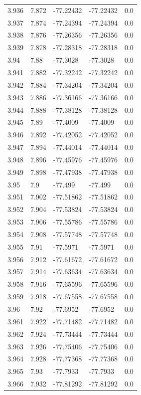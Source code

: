 \begin{tabular}{lllll}
3.936 & 7.872 & -77.22432 & -77.22432 & 0.0 \\
3.937 & 7.874 & -77.24394 & -77.24394 & 0.0 \\
3.938 & 7.876 & -77.26356 & -77.26356 & 0.0 \\
3.939 & 7.878 & -77.28318 & -77.28318 & 0.0 \\
3.94 & 7.88 & -77.3028 & -77.3028 & 0.0 \\
3.941 & 7.882 & -77.32242 & -77.32242 & 0.0 \\
3.942 & 7.884 & -77.34204 & -77.34204 & 0.0 \\
3.943 & 7.886 & -77.36166 & -77.36166 & 0.0 \\
3.944 & 7.888 & -77.38128 & -77.38128 & 0.0 \\
3.945 & 7.89 & -77.4009 & -77.4009 & 0.0 \\
3.946 & 7.892 & -77.42052 & -77.42052 & 0.0 \\
3.947 & 7.894 & -77.44014 & -77.44014 & 0.0 \\
3.948 & 7.896 & -77.45976 & -77.45976 & 0.0 \\
3.949 & 7.898 & -77.47938 & -77.47938 & 0.0 \\
3.95 & 7.9 & -77.499 & -77.499 & 0.0 \\
3.951 & 7.902 & -77.51862 & -77.51862 & 0.0 \\
3.952 & 7.904 & -77.53824 & -77.53824 & 0.0 \\
3.953 & 7.906 & -77.55786 & -77.55786 & 0.0 \\
3.954 & 7.908 & -77.57748 & -77.57748 & 0.0 \\
3.955 & 7.91 & -77.5971 & -77.5971 & 0.0 \\
3.956 & 7.912 & -77.61672 & -77.61672 & 0.0 \\
3.957 & 7.914 & -77.63634 & -77.63634 & 0.0 \\
3.958 & 7.916 & -77.65596 & -77.65596 & 0.0 \\
3.959 & 7.918 & -77.67558 & -77.67558 & 0.0 \\
3.96 & 7.92 & -77.6952 & -77.6952 & 0.0 \\
3.961 & 7.922 & -77.71482 & -77.71482 & 0.0 \\
3.962 & 7.924 & -77.73444 & -77.73444 & 0.0 \\
3.963 & 7.926 & -77.75406 & -77.75406 & 0.0 \\
3.964 & 7.928 & -77.77368 & -77.77368 & 0.0 \\
3.965 & 7.93 & -77.7933 & -77.7933 & 0.0 \\
3.966 & 7.932 & -77.81292 & -77.81292 & 0.0 \\

\end{tabular}

